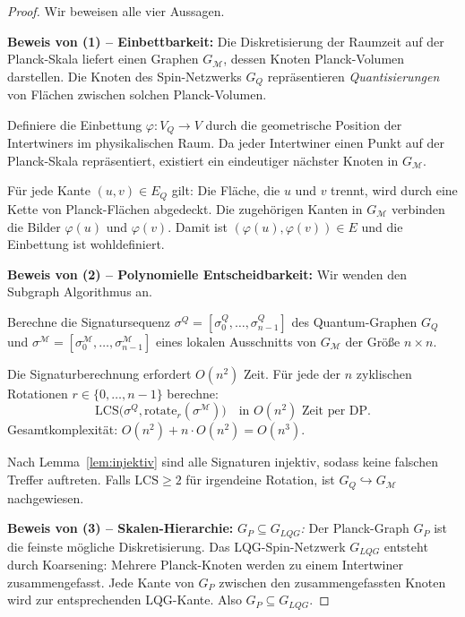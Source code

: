 ﻿\documentclass[a4paper,12pt]{article}
\theoremstyle{definition}
\begin{document}
\begin{proof}
Wir beweisen alle vier Aussagen.

\textbf{Beweis von (1) -- Einbettbarkeit:}
Die Diskretisierung der Raumzeit auf der Planck-Skala liefert einen Graphen
$G_{\mathcal{M}}$, dessen Knoten Planck-Volumen darstellen. Die Knoten des
Spin-Netzwerks $G_Q$ repr\"asentieren \emph{Quantisierungen} von Fl\"achen
zwischen solchen Planck-Volumen.

Definiere die Einbettung $\varphi: V_Q \to V$ durch die geometrische Position
der Intertwiners im physikalischen Raum. Da jeder Intertwiner einen Punkt
auf der Planck-Skala repr\"asentiert, existiert ein eindeutiger n\"achster
Knoten in $G_{\mathcal{M}}$.

F\"ur jede Kante $(u,v) \in E_Q$ gilt: Die Fl\"ache, die $u$ und $v$ trennt,
wird durch eine Kette von Planck-Fl\"achen abgedeckt. Die zugeh\"origen
Kanten in $G_{\mathcal{M}}$ verbinden die Bilder $\varphi(u)$ und $\varphi(v)$.
Damit ist $(\varphi(u), \varphi(v)) \in E$ und die Einbettung ist wohldef\/iniert.

\textbf{Beweis von (2) -- Polynomielle Entscheidbarkeit:}
Wir wenden den Subgraph Algorithmus \cite{epp2026subgraph} an.

Berechne die Signatursequenz $\sigma^Q = [\sigma_0^Q, \ldots, \sigma_{n-1}^Q]$
des Quantum-Graphen $G_Q$ und $\sigma^{\mathcal{M}} = [\sigma_0^{\mathcal{M}}, \ldots, \sigma_{n-1}^{\mathcal{M}}]$
eines lokalen Ausschnitts von $G_{\mathcal{M}}$ der Gr\"o\ss{}e $n \times n$.

Die Signaturberechnung erfordert $O(n^2)$ Zeit. F\"ur jede der $n$ zyklischen
Rotationen $r \in \{0, \ldots, n-1\}$ berechne:
\[
\mathrm{LCS}\bigl(\sigma^Q, \mathrm{rotate}_r(\sigma^{\mathcal{M}})\bigr) \quad
\text{in } O(n^2) \text{ Zeit per DP.}
\]
Gesamtkomplexit\"at: $O(n^2) + n \cdot O(n^2) = O(n^3)$.

Nach Lemma~\ref{lem:injektiv} sind alle Signaturen injektiv, sodass keine
falschen Treffer auftreten. Falls $\mathrm{LCS} \geq 2$ f\"ur irgendeine
Rotation, ist $G_Q \hookrightarrow G_{\mathcal{M}}$ nachgewiesen.

\textbf{Beweis von (3) -- Skalen-Hierarchie:}
\textit{$G_P \subseteq G_{LQG}$:} Der Planck-Graph $G_P$ ist die
feinste m\"ogliche Diskretisierung. Das LQG-Spin-Netzwerk $G_{LQG}$
entsteht durch Koarsening: Mehrere Planck-Knoten werden zu einem Intertwiner
zusammengefasst. Jede Kante von $G_P$ zwischen den zusammengefassten Knoten
wird zur entsprechenden LQG-Kante. Also $G_P \subseteq G_{LQG}$.


\end{proof}
\end{document}
